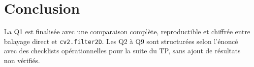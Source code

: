 \documentclass[11pt,a4paper]{article}
\begin{document}
\section{Conclusion}
La Q1 est finalisée avec une comparaison complète, reproductible et chiffrée entre balayage direct et \texttt{cv2.filter2D}. Les Q2 à Q9 sont structurées selon l'énoncé avec des checklists opérationnelles pour la suite du TP, sans ajout de résultats non vérifiés.
\end{document}
